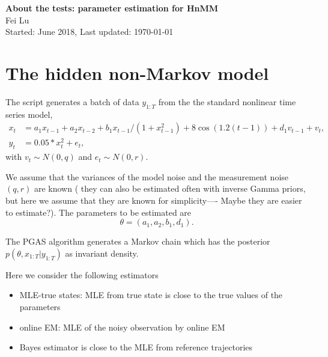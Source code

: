 \documentclass[12pt]{article}
\numberwithin{equation}{section}
\numberwithin{theorem}{section}
\begin{document}
\begin{center}
\textbf{\Large About the tests: parameter estimation for HnMM} \\[0pt]
\vspace{4mm} Fei Lu\\
Started: June 2018, Last updated: \today 
\end{center}

\begin{abstract}  
Estimate parameter by Particle Gibbs with Ancestor Sampling (PGAS) algorithm,
 \end{abstract}

\section{The hidden non-Markov model}

 
The script generates a batch of data $y_{1:T}$ from the the standard nonlinear time series model,
\begin{align}
 x_{t} &= a_1 x_{t-1} + a_2 x_{t-2} + b_1x_{t-1}/(1+x_{t-1}^2)+8\cos(1.2(t-1))+d_1v_{t-1}+ v_t, \\
 y_t &= 0.05*x_t^2 + e_t,
 \end{align}
with $v_t \sim N(0,q)$ and $e_t \sim N(0,r)$. 

We assume that the variances of the model noise and the measurement noise  $(q,r)$ are known ( they can also be estimated often with inverse Gamma priors, but here we assume that they are known for simplicity---- Maybe they are easier to estimate?). The parameters to be estimated are 
\[
\theta = (a_1,a_2,b_1,d_1). 
\]

The PGAS algorithm generates a Markov chain which has the posterior $p(\theta, x_{1:T} | y_{1:T})$ as invariant density. 


Here we consider the following estimators
\begin{itemize}
\item MLE-true states: MLE from true state is close to the true values of the parameters
\item online EM: MLE of the noisy observation by online EM 
\item Bayes estimator is close to the MLE from reference trajectories
\end{itemize}
\end{document}
